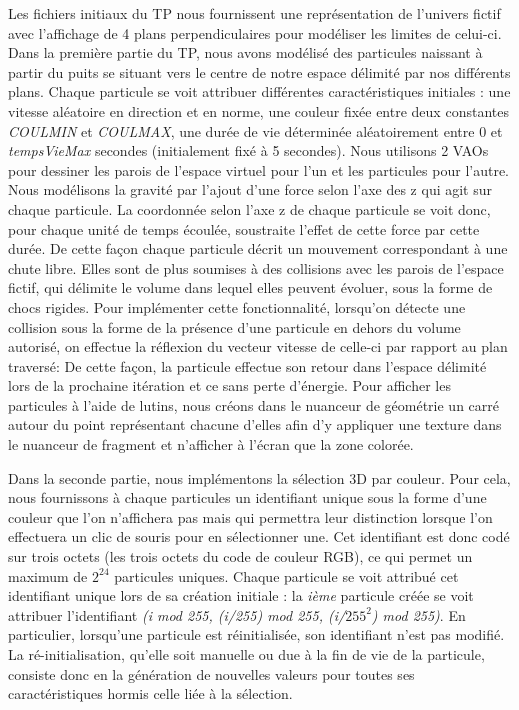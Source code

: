 Les fichiers initiaux du TP nous fournissent une représentation de l'univers fictif avec l'affichage de 4 plans perpendiculaires pour modéliser les limites de celui-ci.
Dans la première partie du TP, nous avons modélisé des particules naissant à partir du puits se situant vers le centre de notre espace délimité par nos différents plans. 
Chaque particule se voit attribuer différentes caractéristiques initiales : une vitesse aléatoire en direction et en norme, une couleur fixée entre deux constantes \textit{COULMIN} et \textit{COULMAX}, une durée de vie déterminée aléatoirement entre 0 et \textit{tempsVieMax} secondes (initialement fixé à 5 secondes).
Nous utilisons 2 VAOs pour dessiner les parois de l'espace virtuel pour l'un et les particules pour l'autre.
Nous modélisons la gravité par l'ajout d'une force selon l'axe des z qui agit sur chaque particule.
La coordonnée selon l'axe z de chaque particule se voit donc, pour chaque unité de temps écoulée, soustraite l'effet de cette force par cette durée.
De cette façon chaque particule décrit un mouvement correspondant à une chute libre.
Elles sont de plus soumises à des collisions avec les parois de l'espace fictif, qui délimite le volume dans lequel elles peuvent évoluer, sous la forme de chocs rigides.
Pour implémenter cette fonctionnalité, lorsqu'on détecte une collision sous la forme de la présence d'une particule en dehors du volume autorisé, on effectue la réflexion du vecteur vitesse de celle-ci par rapport au plan traversé:
De cette façon, la particule effectue son retour dans l'espace délimité lors de la prochaine itération et ce sans perte d'énergie.
Pour afficher les particules à l'aide de lutins, nous créons dans le nuanceur de géométrie un carré autour du point représentant chacune d'elles afin d'y appliquer une texture dans le nuanceur de fragment et n'afficher à l'écran que la zone colorée.

Dans la seconde partie, nous implémentons la sélection 3D  par couleur.
Pour cela, nous fournissons à chaque particules un identifiant unique sous la forme d'une couleur que l'on n'affichera pas mais qui permettra leur distinction lorsque l'on effectuera un clic de souris pour en sélectionner une.
Cet identifiant est donc codé sur trois octets (les trois octets du code de couleur RGB), ce qui permet un maximum de \begin{math} 2^{24} \end{math} particules uniques.
Chaque particule se voit attribué cet identifiant unique lors de sa création initiale : la \textit{ième} particule créée se voit attribuer l'identifiant \textit{(i mod 255, (i/255) mod 255, (i/\begin{math} 255^{2} \end{math}) mod 255)}.
En particulier, lorsqu'une particule est réinitialisée, son identifiant n'est pas modifié.
La ré-initialisation, qu'elle soit manuelle ou due à la fin de vie de la particule, consiste donc en la génération de nouvelles valeurs pour toutes ses caractéristiques hormis celle liée à la sélection.